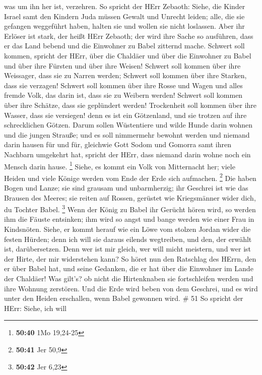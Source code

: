 was um ihn her ist, verzehren.  So spricht der HErr
Zebaoth: Siehe, die Kinder Israel samt den Kindern Juda müssen Gewalt
und Unrecht leiden; alle, die sie gefangen weggeführt haben, halten sie
und wollen sie nicht loslassen.  Aber ihr Erlöser ist
stark, der heißt HErr Zebaoth; der wird ihre Sache so ausführen, dass er
das Land bebend und die Einwohner zu Babel zitternd mache. 
Schwert soll kommen, spricht der HErr, über die Chaldäer und über die
Einwohner zu Babel und über ihre Fürsten und über ihre Weisen!
 Schwert soll kommen über ihre Weissager, dass sie zu
Narren werden; Schwert soll kommen über ihre Starken, dass sie verzagen!
 Schwert soll kommen über ihre Rosse und Wagen und alles
fremde Volk, das darin ist, dass sie zu Weibern werden! Schwert soll
kommen über ihre Schätze, dass sie geplündert werden! 
Trockenheit soll kommen über ihre Wasser, dass sie versiegen! denn es
ist ein Götzenland, und sie trotzen auf ihre schrecklichen Götzen.
 Darum sollen Wüstentiere und wilde Hunde darin wohnen und
die jungen Strauße; und es soll nimmermehr bewohnt werden und niemand
darin hausen für und für,  gleichwie Gott Sodom und Gomorra
samt ihren Nachbarn umgekehrt hat, spricht der HErr, dass niemand darin
wohne noch ein Mensch darin hause. \footnote{\textbf{50:40} 1Mo 19,24-25}
 Siehe, es kommt ein Volk von Mitternacht her; viele Heiden
und viele Könige werden vom Ende der Erde sich aufmachen. \footnote{\textbf{50:41}
  Jer 50,9}  Die haben Bogen und Lanze; sie sind grausam
und unbarmherzig; ihr Geschrei ist wie das Brausen des Meeres; sie
reiten auf Rossen, gerüstet wie Kriegsmänner wider dich, du Tochter
Babel. \footnote{\textbf{50:42} Jer 6,23}  Wenn der König
zu Babel ihr Gerücht hören wird, so werden ihm die Fäuste entsinken; ihm
wird so angst und bange werden wie einer Frau in Kindsnöten.
 Siehe, er kommt herauf wie ein Löwe vom stolzen Jordan
wider die festen Hürden; denn ich will sie daraus eilends wegtreiben,
und den, der erwählt ist, darübersetzen. Denn wer ist mir gleich, wer
will micht meistern, und wer ist der Hirte, der mir widerstehen kann?
 So höret nun den Ratschlag des HErrn, den er über Babel
hat, und seine Gedanken, die er hat über die Einwohner im Lande der
Chaldäer! Was gilt's? ob nicht die Hirtenknaben sie fortschleifen werden
und ihre Wohnung zerstören.  Und die Erde wird beben von
dem Geschrei, und es wird unter den Heiden erschallen, wenn Babel
gewonnen wird. \# 51  So spricht der HErr: Siehe, ich will
